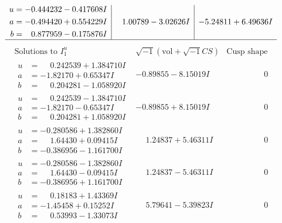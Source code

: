 \documentclass[1p]{elsarticle_modified}
\theoremstyle{definition}
\newcommand{\I}{\sqrt{-1}}
\begin{document}
$$\begin{array}{c|c|c}
\begin{aligned}
u &= -0.444232 - 0.417608 I \\
a &= -0.494420 + 0.554229 I \\
b &= \phantom{-}0.877959 - 0.175876 I\end{aligned}
 & \phantom{-}1.00789 - 3.02626 I & -5.24811 + 6.49636 I\\
 \hline 
 \end{array}$$\newpage$$\begin{array}{c|c|c}  
\text{Solutions to }I^u_{1}& \I (\text{vol} + \sqrt{-1}CS) & \text{Cusp shape}\\
 \hline 
\begin{aligned}
u &= \phantom{-}0.242539 + 1.384710 I \\
a &= -1.82170 + 0.65347 I \\
b &= \phantom{-}0.204281 - 1.058920 I\end{aligned}
 & -0.89855 - 8.15019 I & \phantom{-0.000000 } 0 \\ \hline\begin{aligned}
u &= \phantom{-}0.242539 - 1.384710 I \\
a &= -1.82170 - 0.65347 I \\
b &= \phantom{-}0.204281 + 1.058920 I\end{aligned}
 & -0.89855 + 8.15019 I & \phantom{-0.000000 } 0 \\ \hline\begin{aligned}
u &= -0.280586 + 1.382860 I \\
a &= \phantom{-}1.64430 + 0.09415 I \\
b &= -0.386956 - 1.161700 I\end{aligned}
 & \phantom{-}1.24837 + 5.46311 I & \phantom{-0.000000 } 0 \\ \hline\begin{aligned}
u &= -0.280586 - 1.382860 I \\
a &= \phantom{-}1.64430 - 0.09415 I \\
b &= -0.386956 + 1.161700 I\end{aligned}
 & \phantom{-}1.24837 - 5.46311 I & \phantom{-0.000000 } 0 \\ \hline\begin{aligned}
u &= \phantom{-}0.18183 + 1.43369 I \\
a &= -1.45458 + 0.15252 I \\
b &= \phantom{-}0.53993 - 1.33073 I\end{aligned}
 & \phantom{-}5.79641 - 5.39823 I & \phantom{-0.000000 } 0 \\ \hline\begin{aligned}

\end{aligned}
\end{array}$$
\end{document}
